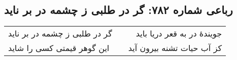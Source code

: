 \begin{center}
\section*{رباعی شماره ۷۸۲: گر در طلبی ز چشمه در بر ناید}
\label{sec:0782}
\begin{longtable}{l p{0.5cm} r}
گر در طلبی ز چشمه در بر ناید
&&
جویندهٔ در به قعر دریا باید
\\
این گوهر قیمتی کسی را شاید
&&
کز آب حیات تشنه بیرون آید
\\
\end{longtable}
\end{center}
